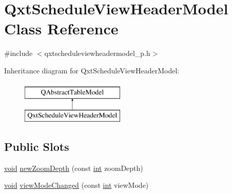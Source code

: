 \hypertarget{class_qxt_schedule_view_header_model}{\section{Qxt\-Schedule\-View\-Header\-Model Class Reference}
\label{class_qxt_schedule_view_header_model}
}


{\ttfamily \#include $<$qxtscheduleviewheadermodel\-\_\-p.\-h$>$}

Inheritance diagram for Qxt\-Schedule\-View\-Header\-Model\-:\begin{figure}[H]
\begin{center}
\leavevmode
\includegraphics[height=2.000000cm]{class_qxt_schedule_view_header_model}
\end{center}
\end{figure}
\subsection*{Public Slots}
\begin{DoxyCompactItemize}
\item 
\hyperlink{group___u_a_v_objects_plugin_ga444cf2ff3f0ecbe028adce838d373f5c}{void} \hyperlink{class_qxt_schedule_view_header_model_af77ac801ca1c0665aa27827325c21550}{new\-Zoom\-Depth} (const \hyperlink{ioapi_8h_a787fa3cf048117ba7123753c1e74fcd6}{int} zoom\-Depth)
\item 
\hyperlink{group___u_a_v_objects_plugin_ga444cf2ff3f0ecbe028adce838d373f5c}{void} \hyperlink{class_qxt_schedule_view_header_model_a7a130bc2babfa93b7c39d257e07cb6ce}{view\-Mode\-Changed} (const \hyperlink{ioapi_8h_a787fa3cf048117ba7123753c1e74fcd6}{int} view\-Mode)
\end{DoxyCompactItemize}
